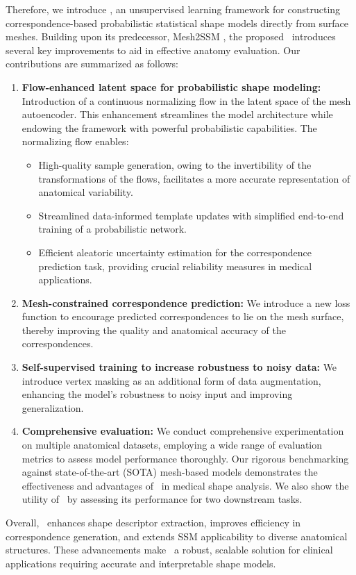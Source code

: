 Therefore, we introduce \model, an unsupervised learning framework for constructing correspondence-based probabilistic statistical shape models directly from surface meshes. Building upon its predecessor, Mesh2SSM \cite{iyer2023mesh2ssm}, the proposed \model~introduces several key improvements to aid in effective anatomy evaluation. Our contributions are summarized as follows: 
\begin{enumerate}
        \item \textbf{Flow-enhanced latent space for probabilistic shape modeling: }Introduction of a continuous normalizing flow \cite{rezende2015variational,dinh2016density} in the latent space of the mesh autoencoder. This enhancement streamlines the model architecture while endowing the framework with powerful probabilistic capabilities. The normalizing flow enables:
        \begin{itemize}
            \item High-quality sample generation, owing to the invertibility of the transformations of the flows, facilitates a more accurate representation of anatomical variability.
            \item Streamlined data-informed template updates with simplified end-to-end training of a probabilistic network. 
            \item Efficient aleatoric uncertainty estimation for the correspondence prediction task, providing crucial reliability measures in medical applications.
        \end{itemize}
        \item \textbf{Mesh-constrained correspondence prediction:} We introduce a new loss function to encourage predicted correspondences to lie on the mesh surface, thereby improving the quality and anatomical accuracy of the correspondences.
        \item \textbf{Self-supervised training to increase robustness to noisy data:} We introduce vertex masking as an additional form of data augmentation, enhancing the model's robustness to noisy input and improving generalization.
        \item \textbf{Comprehensive evaluation:} We conduct comprehensive experimentation on multiple anatomical datasets, employing a wide range of evaluation metrics to assess model performance thoroughly. Our rigorous benchmarking against state-of-the-art (SOTA) mesh-based models demonstrates the effectiveness and advantages of \model~in medical shape analysis. We also show the utility of \model~by assessing its performance for two downstream tasks. 
\end{enumerate}

Overall, \model~enhances shape descriptor extraction, improves efficiency in correspondence generation, and extends SSM applicability to diverse anatomical structures. These advancements make \model~a robust, scalable solution for clinical applications requiring accurate and interpretable shape models.